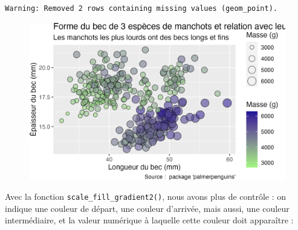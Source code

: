 \documentclass[
  letterpaper,
  DIV=11,
  numbers=noendperiod]{scrreprt}
\begin{document}
\begin{verbatim}
Warning: Removed 2 rows containing missing values (geom_point).
\end{verbatim}

\begin{figure}[H]

{\centering \includegraphics{./03-visualization_files/figure-pdf/unnamed-chunk-96-1.png}

}

\end{figure}

Avec la fonction \texttt{scale\_fill\_gradient2()}, nous avons plus de
contrôle : on indique une couleur de départ, une couleur d'arrivée, mais
aussi, une couleur intermédiaire, et la valeur numérique à laquelle
cette couleur doit apparaître :
\end{document}
